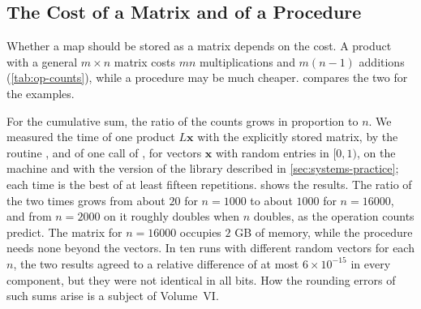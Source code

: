 \subsection{The Cost of a Matrix and of a Procedure}

Whether a map should be stored as a matrix depends on the cost. A product with a general $m\times n$ matrix costs $mn$ multiplications and $m(n-1)$ additions (\cref{tab:op-counts}), while a procedure may be much cheaper.  compares the two for the examples.

\begin{table}
\end{table}

For the cumulative sum, the ratio of the counts grows in proportion to $n$. We measured the time of one product $L\mathbf x$ with the explicitly stored matrix, by the routine , and of one call of , for vectors $\mathbf x$ with random entries in $[0,1)$, on the machine and with the version of the library described in \cref{sec:systems-practice}; each time is the best of at least fifteen repetitions.  shows the results. The ratio of the two times grows from about $20$ for $n=1000$ to about $1000$ for $n=16000$, and from $n=2000$ on it roughly doubles when $n$ doubles, as the operation counts predict. The matrix for $n=16000$ occupies $2$ GB of memory, while the procedure needs none beyond the vectors. In ten runs with different random vectors for each $n$, the two results agreed to a relative difference of at most $6\times10^{-15}$ in every component, but they were not identical in all bits. How the rounding errors of such sums arise is a subject of Volume~VI.


